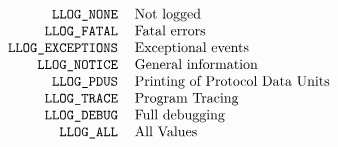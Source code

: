 \normalsize
\[\begin{tabular}{r l}

\tt	LLOG\_NONE&		Not logged \\
\tt	LLOG\_FATAL&		Fatal errors \\
\tt	LLOG\_EXCEPTIONS&	Exceptional events \\
\tt	LLOG\_NOTICE&		General information \\
\tt	LLOG\_PDUS&		Printing of Protocol Data Units\\
\tt	LLOG\_TRACE&		Program Tracing \\
\tt	LLOG\_DEBUG&		Full debugging\\
\tt	LLOG\_ALL&		All Values \\

\end{tabular}\]
